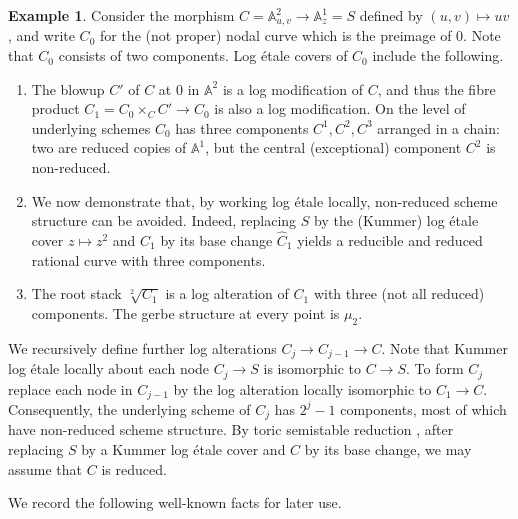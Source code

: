 \documentclass[11pt]{amsart}
\theoremstyle{definition}
\theoremstyle{definition}
\newtheorem{example}[theorem]{Example}
\begin{document}
\begin{example}
    Consider the morphism $C = \mathbb{A}^2_{u,v}\rightarrow \mathbb{A}^1_z = S$ defined by $(u,v) \mapsto uv$, and write $C_0$ for the (not proper) nodal curve which is the preimage of $0$. Note that $C_0$ consists of two components. Log \'etale covers of $C_0$ include the following.
    \begin{enumerate}
        \item The blowup $C'$ of $C$ at $0$ in $\mathbb{A}^2$ is a log modification of $C$, and thus the fibre product $C_1 = C_0 \times_C C'\rightarrow C_0$ is also a log modification. On the level of underlying schemes $C_0$ has three components $C^1,C^2,C^3$ arranged in a chain: two are reduced copies of $\mathbb{A}^1$, but the central (exceptional) component $C^2$ is non-reduced.
        \item We now demonstrate that, by working log \'etale locally, non-reduced scheme structure can be avoided. Indeed, replacing $S$ by the (Kummer) log \'etale cover $z\mapsto z^2$ and $C_1$ by its base change $\hat{C}_1$ yields a reducible and reduced rational curve with three components. 
        \item The root stack $\sqrt[2]{C_1}$ is a log alteration of $C_1$ with three (not all reduced) components. The gerbe structure at every point is $\mu_2$.
    \end{enumerate}
    We recursively define further log alterations $C_j\rightarrow C_{j-1}\rightarrow C$. Note that Kummer log \'etale locally about each node $C_j\rightarrow S$ is isomorphic to $C\rightarrow S$. To form $C_{j}$ replace each node in $C_{j-1}$ by the log alteration locally isomorphic to $C_1\rightarrow C$. Consequently, the underlying scheme of $C_j$ has $2^j-1$ components, most of which have non-reduced scheme structure. By toric semistable reduction \cite{AbramovichKaru,molcho2019universal}, after replacing $S$ by a Kummer log \'etale cover and $C$ by its base change, we may assume that $C$ is reduced.
\end{example}

We record the following well-known facts for later use.
\end{document}
